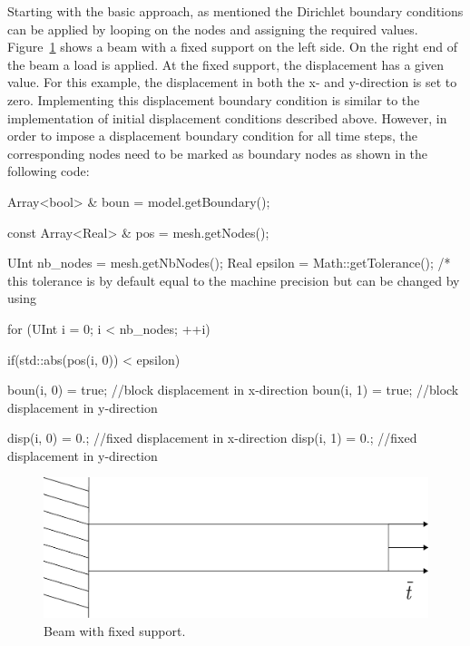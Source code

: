 Starting with the basic approach, as mentioned the Dirichlet boundary
conditions can be applied by looping on the nodes and assigning the
required values. Figure~\ref{fig:smm:dirichlet_bc} shows a beam with a
fixed support on the left side. On the right end of the beam a load is
applied. At the fixed support, the displacement has a given value. For
this example, the displacement in both the x- and y-direction is set
to zero. Implementing this displacement boundary condition is similar
to the implementation of initial displacement conditions described
above. However, in order to impose a displacement boundary condition
for all time steps, the corresponding nodes need to be marked as
boundary nodes as shown in the following code:

 \begin{cpp} Array<bool> & boun = model.getBoundary();

  const Array<Real> & pos = mesh.getNodes();

  UInt nb_nodes = mesh.getNbNodes(); Real epsilon =
Math::getTolerance(); /* this tolerance is by default equal to the
machine precision but can be changed by using

  for (UInt i = 0; i < nb_nodes; ++i) { if(std::abs(pos(i, 0)) <
epsilon) { boun(i, 0) = true; //block displacement in x-direction
boun(i, 1) = true; //block displacement in y-direction

      disp(i, 0) = 0.; //fixed displacement in x-direction disp(i, 1)
= 0.; //fixed displacement in y-direction } }
\end{cpp}
\begin{figure}[!htb] \centering
  \includegraphics[scale=0.4]{figures/dirichlet}
  \caption{Beam with fixed support.\label{fig:smm:dirichlet_bc}}
\end{figure}

